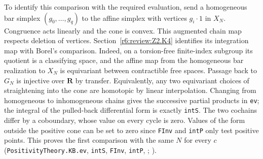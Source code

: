 To identify this comparison with the required evaluation, send a
homogeneous bar simplex $(g_0,\ldots,g_q)$ to the affine simplex with
vertices $g_i\cdot 1$ in $X_N$. Congruence acts linearly and the cone
is convex. This augmented chain map respects deletion of vertices.
Section~\ref{r6:review:Z2.K4} identifies its integration map with Borel's comparison. Indeed,
on a torsion-free finite-index subgroup its quotient is a classifying
space, and the affine map from the homogeneous bar realization to
$X_N$ is equivariant between contractible free spaces. Passage back to
$G_N$ is injective over $\mathbf R$ by transfer. Equivalently, any two
equivariant choices of straightening into the cone are homotopic by
linear interpolation. Changing from homogeneous to inhomogeneous chains
gives the successive partial products in \nolinkurl{ev}; the integral
of the pulled-back differential form is exactly \nolinkurl{intS}.
The two cochains differ by a coboundary, whose value on every cycle is zero. Values of
the form outside the positive cone can be set to zero since
\nolinkurl{FInv} and \nolinkurl{intP} only test positive points.
This proves the first comparison with the same $N$ for every $c$
(\nolinkurl{PositivityTheory.KB.ev}, \nolinkurl{intS},
\nolinkurl{FInv}, \nolinkurl{intP},
;
\cite[Theorem 7.5, proof by passage to a torsion-free subgroup]{P-R5-Borel-stable}).

